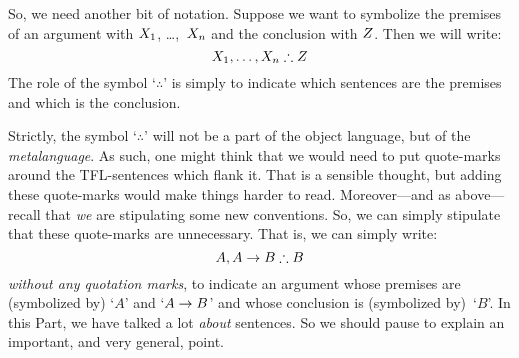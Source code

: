
So, we need another bit of notation. Suppose we want to symbolize the premises of an argument with $X_1$, \dots,~$X_n$ and the conclusion with $Z$. Then we will write:
$$\metaX_1, \ldots, \metaX_n \therefore \metaZ$$
The role of the symbol `$\therefore$' is simply to indicate which sentences are the premises and which is the conclusion.


Strictly, the symbol `$\therefore$' will not be a part of the object language, but of the \emph{metalanguage}. As such, one might think that we would need to put quote-marks around the TFL-sentences which flank it. That is a sensible thought, but adding these quote-marks would make things harder to read. Moreover---and as above---recall that \emph{we} are stipulating some new conventions. So, we can simply stipulate that these quote-marks are unnecessary. That is, we can simply write:
$$A, A \eif B \therefore B$$
\emph{without any quotation marks}, to indicate an argument whose premises are (symbolized by) `$A$' and `$A \rightarrow B$' and whose conclusion is (symbolized by)~`$B$'.
In this Part, we have talked a lot \emph{about} sentences. So we should pause to explain an important, and very general, point.


